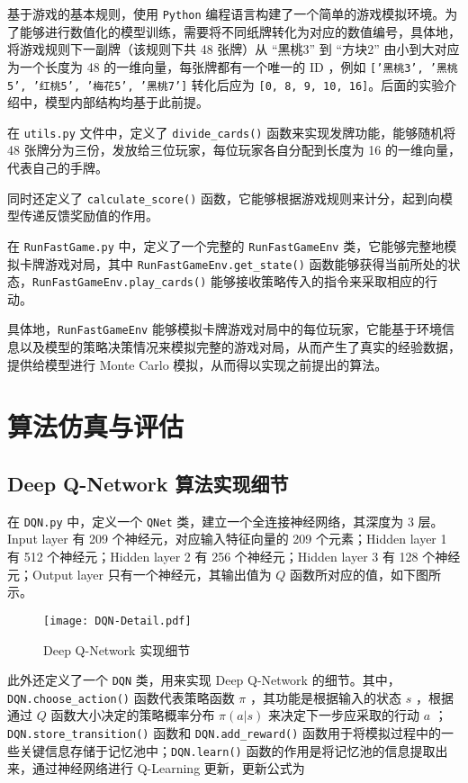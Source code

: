 基于游戏的基本规则，使用 \texttt{Python} 编程语言构建了一个简单的游戏模拟环境。为了能够进行数值化的模型训练，需要将不同纸牌转化为对应的数值编号，具体地，将游戏规则下一副牌（该规则下共 48 张牌）从 “黑桃3” 到 “方块2” 由小到大对应为一个长度为 48 的一维向量，每张牌都有一个唯一的 ID ，例如 \texttt{['黑桃3', '黑桃5', '红桃5', '梅花5', '黑桃7']} 转化后应为 \texttt{[0, 8, 9, 10, 16]}。后面的实验介绍中，模型内部结构均基于此前提。

在 \texttt{utils.py} 文件中，定义了 \texttt{divide\_cards()} 函数来实现发牌功能，能够随机将 48 张牌分为三份，发放给三位玩家，每位玩家各自分配到长度为 16 的一维向量，代表自己的手牌。

同时还定义了 \texttt{calculate\_score()} 函数，它能够根据游戏规则来计分，起到向模型传递反馈奖励值的作用。

在 \texttt{RunFastGame.py} 中，定义了一个完整的 \texttt{RunFastGameEnv} 类，它能够完整地模拟卡牌游戏对局，其中 \texttt{RunFastGameEnv.get\_state()} 函数能够获得当前所处的状态，\texttt{RunFastGameEnv.play\_cards()} 能够接收策略传入的指令来采取相应的行动。

具体地，\texttt{RunFastGameEnv} 能够模拟卡牌游戏对局中的每位玩家，它能基于环境信息以及模型的策略决策情况来模拟完整的游戏对局，从而产生了真实的经验数据，提供给模型进行 Monte Carlo 模拟，从而得以实现之前提出的算法。

\section{算法仿真与评估}

\subsection{Deep Q-Network 算法实现细节}

在 \texttt{DQN.py} 中，定义一个 \texttt{QNet} 类，建立一个全连接神经网络，其深度为 3 层。Input layer 有 209 个神经元，对应输入特征向量的 209 个元素；Hidden layer 1 有 512 个神经元；Hidden layer 2 有 256 个神经元；Hidden layer 3 有 128 个神经元；Output layer 只有一个神经元，其输出值为 $Q$ 函数所对应的值，如下图所示。

\begin{figure}[H]
    \centering
    \texttt{[image: DQN-Detail.pdf]}
    \caption{Deep Q-Network 实现细节}
\end{figure}

此外还定义了一个 \texttt{DQN} 类，用来实现 Deep Q-Network 的细节。其中，\texttt{DQN.choose\_action()} 函数代表策略函数 $\pi$ ，其功能是根据输入的状态 $s$ ，根据通过 $Q$ 函数大小决定的策略概率分布 $\pi(a|s)$ 来决定下一步应采取的行动 $a$ ；\texttt{DQN.store\_transition()} 函数和 \texttt{DQN.add\_reward()} 函数用于将模拟过程中的一些关键信息存储于记忆池中；\texttt{DQN.learn()} 函数的作用是将记忆池的信息提取出来，通过神经网络进行 Q-Learning 更新，更新公式为

